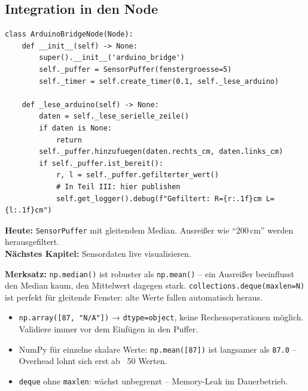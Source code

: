 \subsection{Integration in den Node}

\begin{lstlisting}
class ArduinoBridgeNode(Node):
    def __init__(self) -> None:
        super().__init__('arduino_bridge')
        self._puffer = SensorPuffer(fenstergroesse=5)
        self._timer = self.create_timer(0.1, self._lese_arduino)

    def _lese_arduino(self) -> None:
        daten = self._lese_serielle_zeile()
        if daten is None:
            return
        self._puffer.hinzufuegen(daten.rechts_cm, daten.links_cm)
        if self._puffer.ist_bereit():
            r, l = self._puffer.gefilterter_wert()
            # In Teil III: hier publishen
            self.get_logger().debug(f"Gefiltert: R={r:.1f}cm L={l:.1f}cm")
\end{lstlisting}

\begin{projektBox}
\textbf{Heute:} \texttt{SensorPuffer} mit gleitendem Median.
Ausreißer wie "`200\,cm"' werden herausgefiltert.\\
\textbf{Nächstes Kapitel:} Sensordaten live visualisieren.
\end{projektBox}

\begin{merksatzBox}
\textbf{Merksatz:} \texttt{np.median()} ist robuster als \texttt{np.mean()} --
ein Ausreißer beeinflusst den Median kaum,
den Mittelwert dagegen stark.
\texttt{collections.deque(maxlen=N)} ist perfekt für gleitende Fenster:
alte Werte fallen automatisch heraus.
\end{merksatzBox}

\begin{fehlerBox}
\begin{itemize}
\item \texttt{np.array([87, "N/A"])} → \texttt{dtype=object},
  keine Rechenoperationen möglich.
  Validiere immer vor dem Einfügen in den Puffer.
\item NumPy für einzelne skalare Werte:
  \texttt{np.mean([87])} ist langsamer als \texttt{87.0} -- Overhead lohnt sich erst ab ~50 Werten.
\item \texttt{deque} ohne \texttt{maxlen}: wächst unbegrenzt -- Memory-Leak im Dauerbetrieb.
\end{itemize}
\end{fehlerBox}

